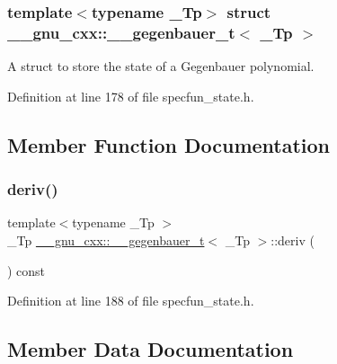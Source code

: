 \subsubsection*{template$<$typename \+\_\+\+Tp$>$\newline
struct \+\_\+\+\_\+gnu\+\_\+cxx\+::\+\_\+\+\_\+gegenbauer\+\_\+t$<$ \+\_\+\+Tp $>$}

A struct to store the state of a Gegenbauer polynomial. 

Definition at line 178 of file specfun\+\_\+state.\+h.



\subsection{Member Function Documentation}
\mbox{\label{struct____gnu__cxx_1_1____gegenbauer__t_a7f67b4bddba90569373b9a7b67492f08}} 
\subsubsection{\texorpdfstring{deriv()}{deriv()}}
{\footnotesize\ttfamily template$<$typename \+\_\+\+Tp $>$ \\
\+\_\+\+Tp \hyperlink{struct____gnu__cxx_1_1____gegenbauer__t}{\+\_\+\+\_\+gnu\+\_\+cxx\+::\+\_\+\+\_\+gegenbauer\+\_\+t}$<$ \+\_\+\+Tp $>$\+::deriv (\begin{DoxyParamCaption}{ }\end{DoxyParamCaption}) const\hspace{0.3cm}{\ttfamily [inline]}}



Definition at line 188 of file specfun\+\_\+state.\+h.



\subsection{Member Data Documentation}
\mbox{\label{struct____gnu__cxx_1_1____gegenbauer__t_acd03976554379a120b360ac86505796e}} 
